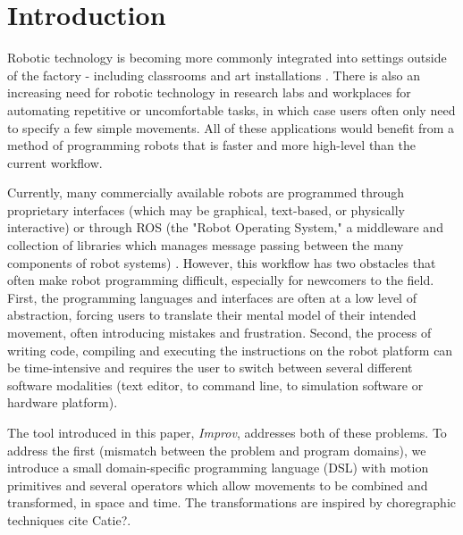 \documentclass[sigconf]{acmart}
\begin{document}
%
%



\maketitle


\section{Introduction}\label{introduction}

Robotic technology is becoming more commonly integrated into settings outside of
the factory - including classrooms \cite{mataric2004robotics} and art installations
\cite{kukaDance2017}. There
is also an increasing need for robotic technology in research labs and
workplaces for automating repetitive or uncomfortable tasks, in which case
users often only need to specify a few simple movements. All of
these applications would benefit from a method of programming robots that is
faster and more high-level than the current workflow.


Currently, many commercially available robots are programmed through proprietary
interfaces (which may be graphical, text-based, or physically interactive) or through ROS (the "Robot Operating System,"
a middleware and collection of libraries which manages message passing between
the many components of robot systems) \cite{rossano2013easy}
\cite{quigley2009ros}. However, this
workflow has two obstacles that often make robot programming difficult,
especially for newcomers to the field. First, the programming languages and
interfaces are
often at a low level of abstraction, forcing users to translate their
mental model of their intended movement, often introducing
mistakes and frustration. Second, the process of writing code, compiling and
executing the instructions on the robot platform can be time-intensive and
requires the user to switch between several different software modalities (text
editor, to command line, to simulation software or hardware platform).

The tool introduced in this paper, \emph{Improv}, addresses both of these
problems. To address the first (mismatch between the problem and
program domains), we introduce a small domain-specific programming language
(DSL) with motion primitives and several operators which allow
movements to be combined and transformed, in space and time. The transformations
are inspired by choregraphic techniques {\color{red} cite Catie?}. 
\end{document}
